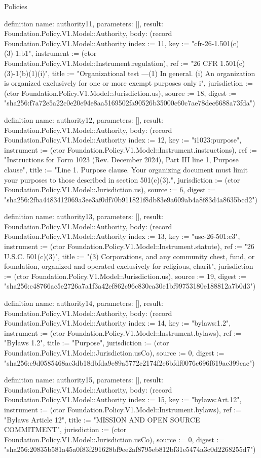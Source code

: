 \begin{lexlean}{Policies}
\begin{semanticmodule}
definition{
  name: authority11,
  parameters: [],
  result: Foundation.Policy.V1.Model::Authority,
  body: (record Foundation.Policy.V1.Model::Authority {index := 11, key := "cfr-26-1.501(c)(3)-1:b1", instrument := (ctor Foundation.Policy.V1.Model::Instrument.regulation), ref := "26 CFR 1.501(c)(3)-1(b)(1)(i)", title := "Organizational test —(1) In general. (i) An organization is organized exclusively for one or more exempt purposes only i", jurisdiction := (ctor Foundation.Policy.V1.Model::Jurisdiction.us), source := 18, digest := "sha256:f7a72e5a22c0e20e94e8aa5169502fa90526b35000c60c7ae78dec6688a73fda"})
}

definition{
  name: authority12,
  parameters: [],
  result: Foundation.Policy.V1.Model::Authority,
  body: (record Foundation.Policy.V1.Model::Authority {index := 12, key := "i1023:purpose", instrument := (ctor Foundation.Policy.V1.Model::Instrument.instructions), ref := "Instructions for Form 1023 (Rev. December 2024), Part III line 1, Purpose clause", title := "Line 1. Purpose clause. Your organizing document must limit your purposes to those described in section 501(c)(3).", jurisdiction := (ctor Foundation.Policy.V1.Model::Jurisdiction.us), source := 6, digest := "sha256:2fba4483412069a3ee3af0df70b911821f8db83e9a609ab4a8f83d4a8635bcd2"})
}

definition{
  name: authority13,
  parameters: [],
  result: Foundation.Policy.V1.Model::Authority,
  body: (record Foundation.Policy.V1.Model::Authority {index := 13, key := "usc-26-501:c3", instrument := (ctor Foundation.Policy.V1.Model::Instrument.statute), ref := "26 U.S.C. 501(c)(3)", title := "(3) Corporations, and any community chest, fund, or foundation, organized and operated exclusively for religious, charit", jurisdiction := (ctor Foundation.Policy.V1.Model::Jurisdiction.us), source := 19, digest := "sha256:c48766ac5e2726a7a1f3a42ef862c96c830ca30e1bf99753180e188812a7b0d3"})
}

definition{
  name: authority14,
  parameters: [],
  result: Foundation.Policy.V1.Model::Authority,
  body: (record Foundation.Policy.V1.Model::Authority {index := 14, key := "bylaws:1.2", instrument := (ctor Foundation.Policy.V1.Model::Instrument.bylaws), ref := "Bylaws 1.2", title := "Purpose", jurisdiction := (ctor Foundation.Policy.V1.Model::Jurisdiction.usCo), source := 0, digest := "sha256:e9d0585468ac3db18dbfda9e89a5772c2174f2e6bfdf0076c696f619ae399cac"})
}

definition{
  name: authority15,
  parameters: [],
  result: Foundation.Policy.V1.Model::Authority,
  body: (record Foundation.Policy.V1.Model::Authority {index := 15, key := "bylaws:Art.12", instrument := (ctor Foundation.Policy.V1.Model::Instrument.bylaws), ref := "Bylaws Article 12", title := "MISSION AND OPEN SOURCE COMMITMENT", jurisdiction := (ctor Foundation.Policy.V1.Model::Jurisdiction.usCo), source := 0, digest := "sha256:20835b581a45a0f83f291628bf9ee2af8795eb812bf31e5474a3c0d2268255d7"})
}


\end{semanticmodule}
\end{lexlean}

